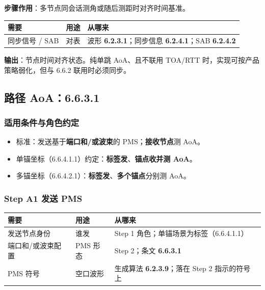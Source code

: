 \documentclass[11pt,a4paper]{ctexart}
\begin{document}
\textbf{步骤作用}：多节点同会话测角或随后测距时对齐时间基准。

\begin{table}[h]
\centering
\small
\begin{tabular}{L{3.2cm}L{5.0cm}L{4.8cm}}
\toprule
\textbf{需要} & \textbf{用途} & \textbf{从哪来} \\
\midrule
同步信号 / SAB & 对表 & 波形 \textbf{6.2.3.1}；同步信息 \textbf{6.2.4.1}；SAB \textbf{6.2.4.2} \\
\bottomrule
\end{tabular}
\end{table}

\textbf{输出}：节点时间对齐状态。纯单跳 AoA、且不联用 TOA/RTT 时，实现可按产品策略弱化，但与 6.6.2 联用时必须同步。

\subsection{路径 AoA：6.6.3.1}
\label{sec:aoa}

\subsubsection{适用条件与角色约定}

\begin{itemize}[nosep]
  \item 标准：发送基于\textbf{端口和/或波束}的 PMS；\textbf{接收节点}测 AoA。
  \item 单锚坐标（6.6.4.1.1）约定：\textbf{标签发}、\textbf{锚点收并测 AoA}。
  \item 多锚坐标（6.6.4.2.1）：\textbf{标签发}、\textbf{多个锚点}分别测 AoA。
\end{itemize}

\subsubsection{Step A1 发送 PMS}

\begin{table}[h]
\centering
\small
\begin{tabular}{L{3.2cm}L{5.0cm}L{4.8cm}}
\toprule
\textbf{需要} & \textbf{用途} & \textbf{从哪来} \\
\midrule
发送节点身份 & 谁发 & Step 1 角色；单锚场景为标签（6.6.4.1.1） \\
端口和/或波束配置 & PMS 形态 & Step 2；条文 \textbf{6.6.3.1} \\
PMS 符号 & 空口波形 & 生成算法 \textbf{6.2.3.9}；落在 Step 2 指示的符号上 \\
\bottomrule
\end{tabular}
\end{table}
\end{document}

